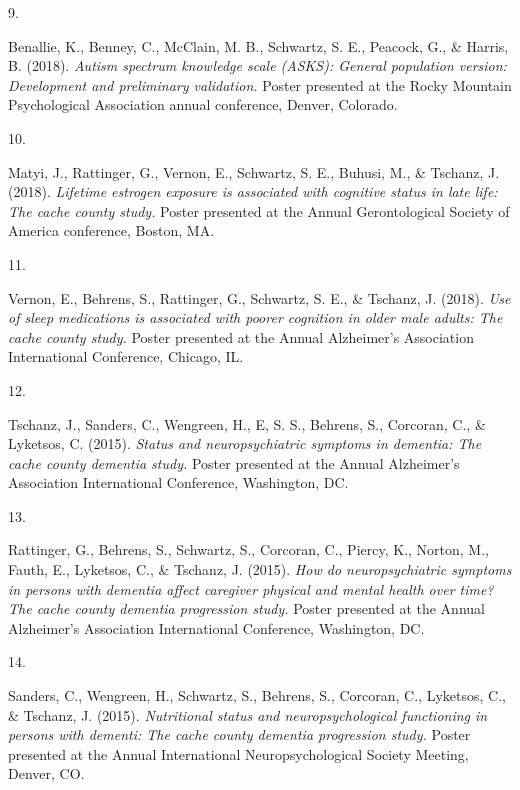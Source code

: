 \documentclass[11pt,a4paper,]{moderncv}
\newlength{\csllabelwidth}
\newcommand{\CSLLeftMargin}[1]{\parbox[t]{\csllabelwidth}{#1}}
\newcommand{\CSLRightInline}[1]{\parbox[t]{\linewidth - \csllabelwidth}{#1}}
\begin{document}
\leavevmode{}%
\CSLLeftMargin{9. }
\CSLRightInline{Benallie, K., Benney, C., McClain, M. B., Schwartz, S.
E., Peacock, G., \& Harris, B. (2018). \emph{Autism spectrum knowledge
scale (ASKS): General population version: Development and preliminary
validation.} Poster presented at the Rocky Mountain Psychological
Association annual conference, Denver, Colorado.}

\leavevmode{}%
\CSLLeftMargin{10. }
\CSLRightInline{Matyi, J., Rattinger, G., Vernon, E., Schwartz, S. E.,
Buhusi, M., \& Tschanz, J. (2018). \emph{Lifetime estrogen exposure is
associated with cognitive status in late life: The cache county study.}
Poster presented at the Annual Gerontological Society of America
conference, Boston, MA.}

\leavevmode{}%
\CSLLeftMargin{11. }
\CSLRightInline{Vernon, E., Behrens, S., Rattinger, G., Schwartz, S. E.,
\& Tschanz, J. (2018). \emph{Use of sleep medications is associated with
poorer cognition in older male adults: The cache county study.} Poster
presented at the Annual Alzheimer's Association International
Conference, Chicago, IL.}

\leavevmode{}%
\CSLLeftMargin{12. }
\CSLRightInline{Tschanz, J., Sanders, C., Wengreen, H., E, S. S.,
Behrens, S., Corcoran, C., \& Lyketsos, C. (2015). \emph{Status and
neuropsychiatric symptoms in dementia: The cache county dementia study.}
Poster presented at the Annual Alzheimer's Association International
Conference, Washington, DC.}

\leavevmode{}%
\CSLLeftMargin{13. }
\CSLRightInline{Rattinger, G., Behrens, S., Schwartz, S., Corcoran, C.,
Piercy, K., Norton, M., Fauth, E., Lyketsos, C., \& Tschanz, J. (2015).
\emph{How do neuropsychiatric symptoms in persons with dementia affect
caregiver physical and mental health over time? The cache county
dementia progression study.} Poster presented at the Annual Alzheimer's
Association International Conference, Washington, DC.}

\leavevmode{}%
\CSLLeftMargin{14. }
\CSLRightInline{Sanders, C., Wengreen, H., Schwartz, S., Behrens, S.,
Corcoran, C., Lyketsos, C., \& Tschanz, J. (2015). \emph{Nutritional
status and neuropsychological functioning in persons with dementi: The
cache county dementia progression study.} Poster presented at the Annual
International Neuropsychological Society Meeting, Denver, CO.}
\end{document}
